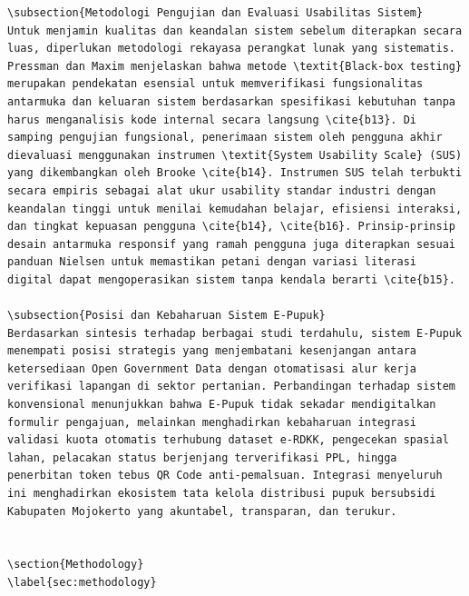 \documentclass[conference]{IEEEtran}
\begin{document}
\begin{lstlisting}
\subsection{Metodologi Pengujian dan Evaluasi Usabilitas Sistem}
Untuk menjamin kualitas dan keandalan sistem sebelum diterapkan secara luas, diperlukan metodologi rekayasa perangkat lunak yang sistematis. Pressman dan Maxim menjelaskan bahwa metode \textit{Black-box testing} merupakan pendekatan esensial untuk memverifikasi fungsionalitas antarmuka dan keluaran sistem berdasarkan spesifikasi kebutuhan tanpa harus menganalisis kode internal secara langsung \cite{b13}. Di samping pengujian fungsional, penerimaan sistem oleh pengguna akhir dievaluasi menggunakan instrumen \textit{System Usability Scale} (SUS) yang dikembangkan oleh Brooke \cite{b14}. Instrumen SUS telah terbukti secara empiris sebagai alat ukur usability standar industri dengan keandalan tinggi untuk menilai kemudahan belajar, efisiensi interaksi, dan tingkat kepuasan pengguna \cite{b14}, \cite{b16}. Prinsip-prinsip desain antarmuka responsif yang ramah pengguna juga diterapkan sesuai panduan Nielsen untuk memastikan petani dengan variasi literasi digital dapat mengoperasikan sistem tanpa kendala berarti \cite{b15}.

\subsection{Posisi dan Kebaharuan Sistem E-Pupuk}
Berdasarkan sintesis terhadap berbagai studi terdahulu, sistem E-Pupuk menempati posisi strategis yang menjembatani kesenjangan antara ketersediaan Open Government Data dengan otomatisasi alur kerja verifikasi lapangan di sektor pertanian. Perbandingan terhadap sistem konvensional menunjukkan bahwa E-Pupuk tidak sekadar mendigitalkan formulir pengajuan, melainkan menghadirkan kebaharuan integrasi validasi kuota otomatis terhubung dataset e-RDKK, pengecekan spasial lahan, pelacakan status berjenjang terverifikasi PPL, hingga penerbitan token tebus QR Code anti-pemalsuan. Integrasi menyeluruh ini menghadirkan ekosistem tata kelola distribusi pupuk bersubsidi Kabupaten Mojokerto yang akuntabel, transparan, dan terukur.


\section{Methodology}
\label{sec:methodology}


\end{lstlisting}
\end{document}
